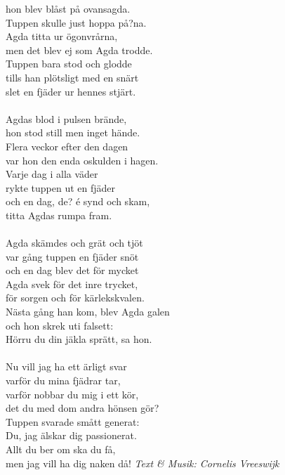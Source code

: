 hon blev blåst på ovansagda.\\
Tuppen skulle just hoppa på?na.\\
Agda titta ur ögonvrårna,\\
men det blev ej som Agda trodde.\\
Tuppen bara stod och glodde\\
tills han plötsligt med en snärt\\
slet en fjäder ur hennes stjärt.\\
\\
Agdas blod i pulsen brände,\\
hon stod still men inget hände.\\
Flera veckor efter den dagen\\
var hon den enda oskulden i hagen.\\
Varje dag i alla väder\\
rykte tuppen ut en fjäder\\
och en dag, de? é synd och skam,\\
titta Agdas rumpa fram.\\
\\
Agda skämdes och grät och tjöt\\
var gång tuppen en fjäder snöt\\
och en dag blev det för mycket\\
Agda svek för det inre trycket,\\
för sorgen och för kärlekskvalen.\\
Nästa gång han kom, blev Agda galen\\
och hon skrek uti falsett:\\
Hörru du din jäkla sprätt, sa hon.\\
\\
Nu vill jag ha ett ärligt svar\\
varför du mina fjädrar tar,\\
varför nobbar du mig i ett kör,\\
det du med dom andra hönsen gör?\\
Tuppen svarade smått generat:\\
Du, jag älskar dig passionerat.\\
Allt du ber om ska du få,\\
men jag vill ha dig naken då!
\vspace{10pt}
{\footnotesize\textit{Text \& Musik: Cornelis Vreeswijk}}
